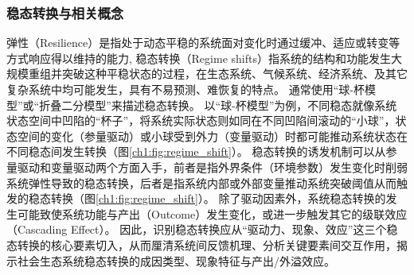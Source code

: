 
\subsubsection{稳态转换与相关概念}

弹性（Resilience）是指处于动态平稳的系统面对变化时通过缓冲、适应或转变等方式响应得以维持的能力\cite{folke2010}, 稳态转换（Regime shifts）指系统的结构和功能发生大规模重组并突破这种平稳状态的过程\cite{scheffer2001}，在生态系统、气候系统、经济系统、及其它复杂系统中均可能发生，具有不易预测、难恢复的特点\cite{scheffer2003, biggs2009}。
通常使用“球-杯模型”或“折叠二分模型”来描述稳态转换。
以“球-杯模型”为例，不同稳态就像系统状态空间中凹陷的“杯子”，将系统实际状态则如同在不同凹陷间滚动的“小球”，状态空间的变化（参量驱动）或小球受到外力（变量驱动）时都可能推动系统状态在不同稳态间发生转换\cite{scheffer2009, folke2010}（图\ref{ch1:fig:regime_shift}）。
稳态转换的诱发机制可以从参量驱动和变量驱动两个方面入手，前者是指外界条件（环境参数）发生变化时削弱系统弹性导致的稳态转换，后者是指系统内部或外部变量推动系统突破阈值从而触发的稳态转换\cite{scheffer2009, folke2010}（图\ref{ch1:fig:regime_shift}）。
除了驱动因素外，系统稳态转换的发生可能致使系统功能与产出（Outcome）发生变化，或进一步触发其它的级联效应（Cascading Effect）\cite{rocha2018}。
因此，识别稳态转换应从“驱动力、现象、效应”这三个稳态转换的核心要素切入，从而厘清系统间反馈机理、分析关键要素间交互作用，揭示社会\textendash{}生态系统稳态转换的成因类型、现象特征与产出/外溢效应。

